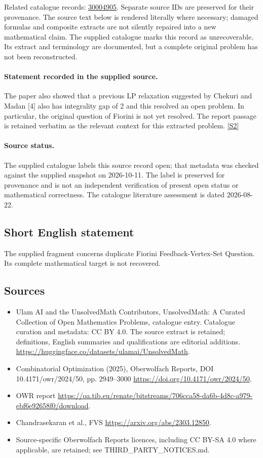 \documentclass[11pt]{article}
\begin{document}
Related catalogue records: \href{https://mehmetmars7.github.io/Erdosproblems-llm-hunter/problem.html?type=open_problems&id=30004905}{30004905}. Separate source IDs are preserved for their provenance.
The source text below is rendered literally where necessary; damaged formulas and composite extracts are not silently repaired into a new mathematical claim.
The supplied catalogue marks this record as unrecoverable. Its extract and terminology are documented, but a complete original problem has not been reconstructed.
\paragraph{Statement recorded in the supplied source.}
The paper also showed that a previous LP relaxation suggested by Chekuri and Madan [4] also has integrality gap of 2 and this resolved an open problem. In particular, the original question of Fiorini is not yet resolved. The report passage is retained verbatim as the relevant context for this extracted problem. \href{https://doi.org/10.4171/owr/2024/50}{[S2]}
\paragraph{Source status.}
The supplied catalogue labels this source record open; that metadata was checked against the supplied snapshot on 2026-10-11. The label is preserved for provenance and is not an independent verification of present open status or mathematical correctness. The catalogue literature assessment is dated 2026-08-22.
\subsection{Short English statement}
The supplied fragment concerns duplicate Fiorini Feedback-Vertex-Set Question. Its complete mathematical target is not recovered.
\subsection{Sources}
\begin{itemize}
\item[S1] Ulam AI and the UnsolvedMath Contributors, UnsolvedMath: A Curated Collection of Open Mathematics Problems, catalogue entry. Catalogue curation and metadata: CC BY 4.0. The source extract is retained; definitions, English summaries and qualifications are editorial additions.
\url{https://huggingface.co/datasets/ulamai/UnsolvedMath}.
\item[S2] Combinatorial Optimization (2025), Oberwolfach Reports, DOI 10.4171/owr/2024/50, pp. 2949--3000
\url{https://doi.org/10.4171/owr/2024/50}.
\item[S3] OWR report
\url{https://oa.tib.eu/renate/bitstreams/706cca58-da6b-4d8c-a979-ebf6e92658f0/download}.
\item[S4] Chandrasekaran et al., FVS
\url{https://arxiv.org/abs/2303.12850}.
\item Source-specific Oberwolfach Reports licences, including CC BY-SA 4.0 where applicable, are retained; see THIRD\_PARTY\_NOTICES.md.
\end{itemize}
\end{document}

